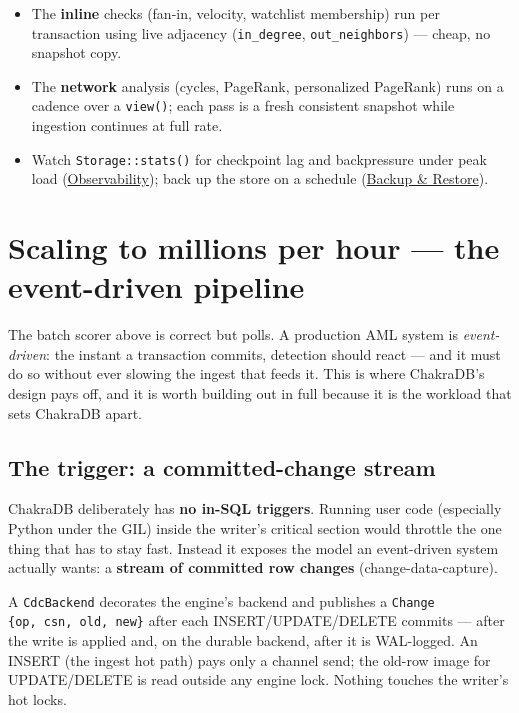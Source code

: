 \documentclass[
  11pt,
  openany]{book}
\providecommand{\tightlist}{%
  \setlength{\itemsep}{0pt}\setlength{\parskip}{0pt}}
\begin{document}
\begin{itemize}
\tightlist
\item
  The \textbf{inline} checks (fan-in, velocity, watchlist membership)
  run per transaction using live adjacency (\texttt{in\_degree},
  \texttt{out\_neighbors}) --- cheap, no snapshot copy.
\item
  The \textbf{network} analysis (cycles, PageRank, personalized
  PageRank) runs on a cadence over a \texttt{view()}; each pass is a
  fresh consistent snapshot while ingestion continues at full rate.
\item
  Watch \texttt{Storage::stats()} for checkpoint lag and backpressure
  under peak load
  (\href{../getting-started/getting-started.md}{Observability}); back up
  the store on a schedule
  (\href{../getting-started/getting-started.md}{Backup \& Restore}).
\end{itemize}

\section{Scaling to millions per hour --- the event-driven
pipeline}\label{scaling-to-millions-per-hour-the-event-driven-pipeline}

The batch scorer above is correct but polls. A production AML system is
\emph{event-driven}: the instant a transaction commits, detection should
react --- and it must do so without ever slowing the ingest that feeds
it. This is where ChakraDB's design pays off, and it is worth building
out in full because it is the workload that sets ChakraDB apart.

\subsection{The trigger: a committed-change
stream}\label{the-trigger-a-committed-change-stream}

ChakraDB deliberately has \textbf{no in-SQL triggers}. Running user code
(especially Python under the GIL) inside the writer's critical section
would throttle the one thing that has to stay fast. Instead it exposes
the model an event-driven system actually wants: a \textbf{stream of
committed row changes} (change-data-capture).

A \texttt{CdcBackend} decorates the engine's backend and publishes a
\texttt{Change} \texttt{\{op,\ csn,\ old,\ new\}} after each
INSERT/UPDATE/DELETE commits --- after the write is applied and, on the
durable backend, after it is WAL-logged. An INSERT (the ingest hot path)
pays only a channel send; the old-row image for UPDATE/DELETE is read
outside any engine lock. Nothing touches the writer's hot locks.
\end{document}
